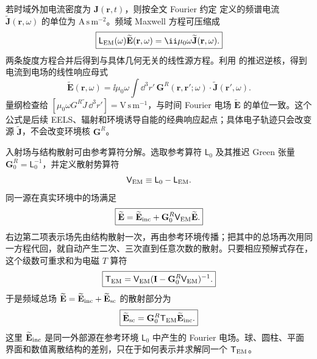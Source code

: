\begin{proposition}[电流到电场的推迟响应]
若时域外加电流密度为 $\mathbf J(\mathbf r,t)$，则按全文 Fourier 约定 定义的频谱电流 $\widetilde{\mathbf J}(\mathbf r,\omega)$ 的单位为 $\mathrm{A\,s\,m^{-2}}$。频域 Maxwell 方程可压缩成
\begin{equation}
\boxed{
\mathsf L_{\rm EM}(\omega)\widetilde{\mathbf E}(\mathbf r,\omega)
=\ii\mu_0\omega\widetilde{\mathbf J}(\mathbf r,\omega).}
\label{eq:maxwell-source-operator-dp68}
\end{equation}
两条旋度方程合并后得到与具体几何无关的线性源方程。利用 的推迟逆核，得到电流到电场的线性响应母式
\begin{equation}
 \boxed{
 \widetilde{\mathbf E}(\mathbf r,\omega)
 =\ii\mu_0\omega
 \int\dd^3 r'\,
 \mathbf G^R(\mathbf r,\mathbf r';\omega)
 \cdot\widetilde{\mathbf J}(\mathbf r',\omega).}
 \label{eq:E-from-GJ-SI-r12}\end{equation}
量纲检查给 $[\mu_0\omega G^R\widetilde J\,\dd^3 r']=\mathrm{V\,s\,m^{-1}}$，与时间 Fourier 电场 $\widetilde{\mathbf E}$ 的单位一致。这个公式是后续 EELS、辐射和环境诱导自能的经典响应起点；具体电子轨迹只会改变源 $\widetilde{\mathbf J}$，不会改变环境核 $\mathbf G^R$。

\end{proposition}

入射场与结构散射可由参考算符分解。选取参考算符 $\mathsf L_0$ 及其推迟 Green 张量 $\mathbf G_0^R=\mathsf L_0^{-1}$，并定义散射势算符
\begin{equation*}
 \mathsf V_{\rm EM}\equiv\mathsf L_0-\mathsf L_{\rm EM}.
\end{equation*}
同一源在真实环境中的场满足
\begin{equation}
\boxed{
\widetilde{\mathbf E}
=\widetilde{\mathbf E}_{\rm inc}+\mathbf G_0^R\mathsf V_{\rm EM}\widetilde{\mathbf E}.}
\label{eq:maxwell-lippmann-schwinger-dp68}
\end{equation}
右边第二项表示场先由结构散射一次，再由参考环境传播；把其中的总场再次用同一方程代回，就自动产生二次、三次直到任意次数的散射。只要相应预解式存在，这个级数可重求和为电磁 $T$ 算符
\begin{equation}
 \boxed{
 \mathsf T_{\rm EM}
 =\mathsf V_{\rm EM}
 (\mathbf I-\mathbf G_0^R\mathsf V_{\rm EM})^{-1}.}
 \label{eq:maxwell-t-operator-def-r16}
\end{equation}
于是频域总场 $\widetilde{\mathbf E}=\widetilde{\mathbf E}_{\rm inc}+\widetilde{\mathbf E}_{\rm sc}$ 的散射部分为
\begin{equation}
 \boxed{
 \widetilde{\mathbf E}_{\rm sc}
 =\mathbf G_0^R\mathsf T_{\rm EM}\widetilde{\mathbf E}_{\rm inc}.}
 \label{eq:maxwell_scattered_field_t_operator}
\end{equation}
这里 $\widetilde{\mathbf E}_{\rm inc}$ 是同一外部源在参考环境 $\mathsf L_0$ 中产生的 Fourier 电场。球、圆柱、平面界面和数值离散结构的差别，只在于如何表示并求解同一个 $\mathsf T_{\rm EM}$。

